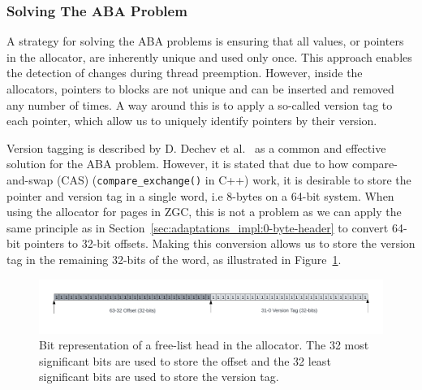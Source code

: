 \subsubsection{Solving The ABA Problem}
\label{sec:adaptations_impl:aba_problem}


A strategy for solving the ABA problems is ensuring that all values, or pointers in the allocator, are inherently unique and used only once. This approach enables the detection of changes during thread preemption. However, inside the allocators, pointers to blocks are not unique and can be inserted and removed any number of times. A way around this is to apply a so-called version tag to each pointer, which allow us to uniquely identify pointers by their version.

Version tagging is described by D. Dechev et al.~\cite{bjarne_aba} as a common and effective solution for the ABA problem. However, it is stated that due to how compare-and-swap (CAS) (\texttt{compare\_exchange()} in C++) work, it is desirable to store the pointer and version tag in a single word, i.e 8-bytes on a 64-bit system. When using the allocator for pages in ZGC, this is not a problem as we can apply the same principle as in Section~\ref{sec:adaptations_impl:0-byte-header} to convert 64-bit pointers to 32-bit offsets. Making this conversion allows us to store the version tag in the remaining 32-bits of the word, as illustrated in Figure~\ref{fig:concurrent_head_bits}.

\begin{figure}[H]
    \centering
    \includegraphics[width=1\textwidth]{figures/concurrent_head_bits.png}
    \caption{Bit representation of a free-list head in the allocator. The 32 most significant bits are used to store the offset and the 32 least significant bits are used to store the version tag.}
    \label{fig:concurrent_head_bits}
\end{figure}

